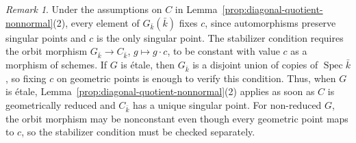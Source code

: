 \documentclass[10pt,abstract=true]{scrartcl}
\numberwithin{equation}{section}
\theoremstyle{definition}
\theoremstyle{remark}
\newtheorem{remark}[theorem]{Remark}
\begin{document}
\begin{remark}\label{rmk:diagonal-quotient-cusp}
  Under the assumptions on $C$ in Lemma~\ref{prop:diagonal-quotient-nonnormal}\textup{(2)}, every element of $G_{\bar k}(\bar k)$ fixes $c$, since automorphisms preserve singular points and $c$ is the only singular point.
  The stabilizer condition requires the orbit morphism $G_{\bar k}\to C_{\bar k}$, $g\mapsto g\cdot c$, to be constant with value $c$ as a morphism of schemes.
  If $G$ is \'{e}tale, then $G_{\bar k}$ is a disjoint union of copies of $\operatorname{Spec}\bar k$, so fixing $c$ on geometric points is enough to verify this condition.
  Thus, when $G$ is \'{e}tale, Lemma~\ref{prop:diagonal-quotient-nonnormal}\textup{(2)} applies as soon as $C$ is geometrically reduced and $C_{\bar k}$ has a unique singular point.
  For non-reduced $G$, the orbit morphism may be nonconstant even though every geometric point maps to $c$, so the stabilizer condition must be checked separately.
\end{remark}
\end{document}
